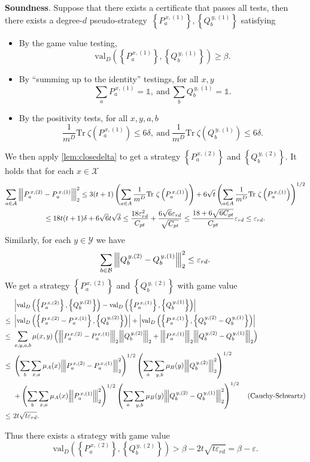 \documentclass[11pt]{article}
\theoremstyle{plain}
\theoremstyle{definition}
\newcommand {\set} [1] {\ensuremath{ \left\lbrace #1 \right\rbrace }}
\newcommand {\br} [1] {\ensuremath{ \left( #1 \right) }}
\newcommand {\ab} [1] {\ensuremath{ \left| #1 \right| }}
\newcommand{\nnorm}[1]{{\left\vert\kern-0.25ex\left\vert\kern-0.25ex\left\vert #1
		\right\vert\kern-0.25ex\right\vert\kern-0.25ex\right\vert}}
\newcommand {\Tr} {\ensuremath{ \mathrm{Tr} }}
\newcommand {\id} {\ensuremath{\mathds{1}}}
\newcommand{\gval}[3]{\ensuremath{\mathrm{val}_{#1}\br{\set{#2},\set{#3}}}}
\newcommand{\ep} {\ensuremath{\varepsilon}}
\newcommand{\dmcc} {\ensuremath{C_{pt}}}
\newcommand{\dlbo} {\ensuremath{{D}}}
\newcommand{\eprd} {\ensuremath{\ep_{rd}}}
\newcommand{\pseudostrategy} {pseudo-strategy}
\newcommand{\Pnn}[1] {\ensuremath{{P^{\,x, (#1)}_a}}}
\newcommand{\Qnn}[1] {\ensuremath{{Q^{\,y, (#1)}_b}}}
\newcommand{\calX}{\mathcal{X}}
\newcommand{\calY}{\mathcal{Y}}
\newcommand{\calA}{\mathcal{A}}
\newcommand{\calB}{\mathcal{B}}
\newcommand{\1}{\mathbb{1}} %
\begin{document}
\textbf{Soundness}.
Suppose that there exists a certificate that passes all tests,
then there exists a degree-$d$ \pseudostrategy\ $\set{\Pnn{1}}, \set{\Qnn{1}}$ satisfying
\begin{itemize}
  \item By the game value testing,
      $$\gval{\dlbo}{\Pnn{1}}{\Qnn{1}}\ge\beta.$$
  \item By ``summing up to the identity'' testings, for all $x, y$
      $$\sum_{a}\Pnn{1}=\id,~\mbox{and}~\sum_{b}\Qnn{1}=\id.$$

  \item By the positivity tests,
      for all $x, y, a, b$
      $$\frac{1}{m^\dlbo}\Tr~\zeta\br{\Pnn{1}}\leq 6\delta,~\mbox{and}~\frac{1}{m^\dlbo}\Tr~\zeta\br{\Qnn{1}}\leq 6\delta.$$
\end{itemize}
We then apply \cref{lem:closedelta} to get a strategy
$\set{\Pnn{2}}$ and $\set{\Qnn{2}}$.
It holds that for each $x\in\calX$
\begin{multline*}
  \sum_{a\in\calA}\nnorm{\Pnn{2}-\Pnn{1}}_2^2
  \le3(t+1)\br{\sum_{a\in A}\frac{1}{m^\dlbo}\Tr~\zeta\br{\Pnn{1}}}
    +6\sqrt{t}\br{\sum_{a\in A}\frac{1}{m^\dlbo}\Tr~\zeta\br{\Pnn{1}}}^{1/2} \\
  \le 18t(t+1)\delta + 6\sqrt{6}t\sqrt{\delta}
  \le \frac{18\eprd^2}{\dmcc} + \frac{6\sqrt{6}\eprd}{\sqrt{\dmcc}}\le\frac{18+6\sqrt{6\dmcc}}{\dmcc}\eprd\le\eprd.
\end{multline*}
Similarly, for each $y\in\calY$ we have
$$\sum_{b\in\calB}\nnorm{\Qnn{2}-\Qnn{1}}_2^2\le\eprd.$$
We get a strategy $\set{\Pnn{2}}$ and $\set{\Qnn{2}}$ with game value
\begin{align*}
&\ab{\gval{D}{\Pnn{2}}{\Qnn{2}}-\gval{D}{\Pnn{1}}{\Qnn{1}}}\\
\leq~&\ab{\gval{D}{\Pnn{2}-\Pnn{1}}{\Qnn{2}}}+\ab{\gval{D}{\Pnn{1}}{\Qnn{2}-\Qnn{1}}}\\
\leq~&\sum_{x,y,a,b}\mu(x,y)\br{\nnorm{\Pnn{2}-\Pnn{1}}_2\nnorm{\Qnn{2}}_2+\nnorm{\Pnn{1}}_2\nnorm{\Qnn{2}-\Qnn{1}}_2}\\
\leq~&\br{\sum_b\sum_{x,a}\mu_A(x)\nnorm{\Pnn{2}-\Pnn{1}}_2^2}^{1/2}\br{\sum_a\sum_{y,b}\mu_B(y)\nnorm{\Qnn{2}}_2^2}^{1/2}\\
&+\br{\sum_b\sum_{x,a}\mu_A(x)\nnorm{\Pnn{1}}_2^2}^{1/2}\br{\sum_a\sum_{y,b}\mu_B(y)\nnorm{\Qnn{2}-\Qnn{1}}_2^2}^{1/2}\quad\mbox{(Cauchy-Schwartz)}\\
\le~&2t\sqrt{t\eprd}.
\end{align*}

Thus there exists a strategy with game value
$$\gval{D}{\Pnn{2}}{\Qnn{2}} >\beta - 2t\sqrt{t\eprd}=\beta - \ep.$$
\end{document}
